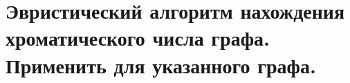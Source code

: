 \section{Эвристический алгоритм нахождения хроматического числа графа. Применить для указанного 
графа.}

